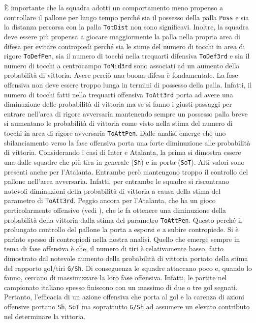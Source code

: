 È importante che la squadra adotti un comportamento meno propenso a controllare il pallone per lungo tempo perché sia il possesso della palla \texttt{Poss} e sia la distanza percorsa con la palla \texttt{TotDist} non sono significavi. Inoltre, la squadra deve essere più propensa a giocare maggiormente la palla nella propria area di difesa per evitare contropiedi perché sia le stime del numero di tocchi in area di rigore \texttt{ToDefPen}, sia il numero di tocchi nella trequarti difensiva \texttt{ToDef3rd} e sia il numero di tocchi a centrocampo \texttt{ToMid3rd} sono associati ad un aumento della probabilità di vittoria. Avere perciò una buona difesa è fondamentale. La fase offensiva non deve essere troppo lunga in termini di possesso della palla. Infatti, il numero di tocchi fatti nella trequarti offensiva \texttt{ToAtt3rd} porta ad avere una diminuzione delle probabilità di vittoria ma se si fanno i giusti passaggi per entrare nell'area di rigore avversaria mantenendo sempre un possesso palla breve si aumentano le probabilità di vittoria come visto nella stima del numero di tocchi in area di rigore avversaria \texttt{ToAttPen}. Dalle analisi emerge che uno sbilanciamento verso la fase offensiva porta una forte diminuzione alle probabilità di vittoria. Considerando i casi di Inter e Atalanta, la prima si dimostra essere una dalle squadre che più tira in generale (\texttt{Sh}) e in porta (\texttt{SoT}). Alti valori sono presenti anche per l'Atalanta. Entrambe però mantengono troppo il controllo del pallone nell'area avversaria. Infatti, per entrambe le squadre si riscontrano notevoli diminuzioni della probabilità di vittoria a causa della stima del parametro di \texttt{ToAtt3rd}. Peggio ancora per l'Atalanta, che ha un gioco particolarmente offensivo (vedi \textit{\cite{ataGioco}}), che le fa ottenere una diminuzione della probabilità della vittoria dalla stima del parametro \texttt{ToAttPen}. Questo perché il prolungato controllo del pallone la porta a esporsi e a subire contropiede. Si è parlato spesso di contropiedi nella nostra analisi. Quello che emerge sempre in tema di fase offensiva è che, il numero di tiri è relativamente basso, fatto dimostrato dal notevole aumento della probabilità di vittoria portato della stima del rapporto gol/tiri \texttt{G/Sh}. Di conseguenza le squadre attaccano poco e, quando lo fanno, cercano di massimizzare la loro fase offensiva. Infatti, le partite nel campionato italiano spesso finiscono con un massimo di due o tre gol segnati. Pertanto, l'efficacia di un azione offensiva che porta al gol e la carenza di azioni offensive portano \texttt{Sh}, \texttt{SoT} ma soprattutto \texttt{G/Sh} ad assumere un elevato contributo nel determinare la vittoria.\\
